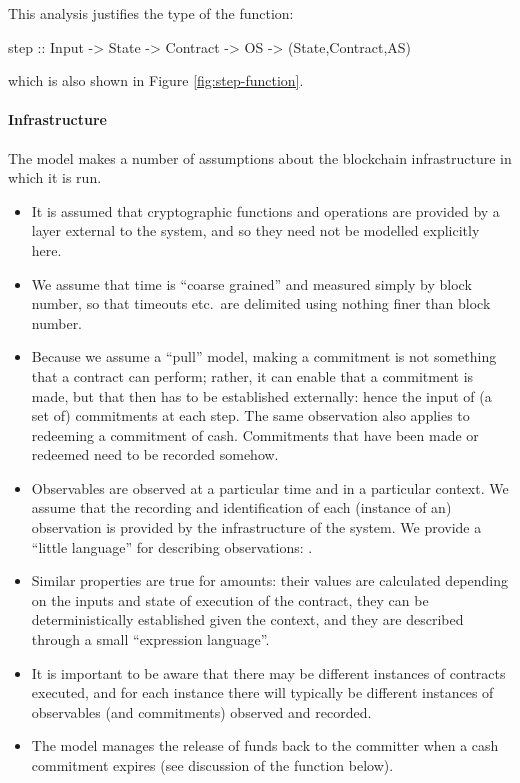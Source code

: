 \documentclass[runningheads]{llncs}
\begin{document}
This analysis justifies the type of the  function:

\begin{haskellcode}
step :: Input -> State -> Contract -> OS -> (State,Contract,AS)
\end{haskellcode}

which is also shown in Figure \ref{fig:step-function}.

\paragraph{Infrastructure}

The model makes a number of assumptions about the blockchain infrastructure in which it is run.

\begin{itemize}
\item It is assumed that cryptographic functions and operations are provided by a layer external to the system, and so 
they need not be modelled explicitly here.
\item We assume that time is ``coarse grained'' and measured simply by block number, so that timeouts etc.\ are 
delimited using nothing finer than block number. 
\item Because we assume a ``pull'' model, making a commitment is not something that a contract can perform; rather, it 
can enable that a commitment is made, but that then has to be established externally: hence the input of (a set of) 
commitments at each step. The same observation also applies to redeeming a commitment of cash. Commitments that have 
been made or redeemed need to be recorded somehow.

\item Observables are observed at a particular time and in a particular context. We assume that the recording and 
identification of each (instance of an) observation is provided by the infrastructure of the system. We provide a 
``little language'' for describing observations: . 
\item
Similar properties are true for
 amounts: their values are calculated depending on the inputs and state of execution of the 
contract, they can be deterministically established given the context, and they are described through a small 
``expression language''.
\item It is important to be aware that there may be different instances of contracts executed, and for each instance 
there will typically be different instances of observables (and commitments) observed and recorded.
\item The model manages the release of funds back to the committer when a cash commitment expires (see discussion of 
the  function below).
\end{itemize}
\end{document}
